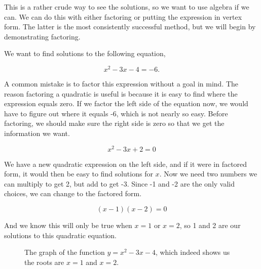 This is a rather crude way to see the solutions, so we want to use algebra if we can.  We can do this with either factoring or putting the expression in vertex form.  The latter is the most consistently successful method, but we will begin by demonstrating factoring.

We want to find solutions to the following equation,

$$x^2 - 3x - 4 = - 6.$$

A common mistake is to factor this expression without a goal in mind.  The reason factoring a quadratic is useful is because it is easy to find where the expression equals zero.  If we factor the left side of the equation now, we would have to figure out where it equals -6, which is not nearly so easy.  Before factoring, we should make sure the right side is zero so that we get the information we want.

$$x^2 - 3x + 2 = 0$$

We have a new quadratic expression on the left side, and if it were in factored form, it would then be easy to find solutions for $x$.  Now we need two numbers we can multiply to get 2, but add to get -3.  Since -1 and -2 are the only valid choices, we can change to the factored form.

$$(x-1)(x-2) = 0$$

And we know this will only be true when $x = 1$ or $x = 2$, so 1 and 2 are our solutions to this quadratic equation.

\begin{figure*}[h]
\begin{center}
\caption{The graph of the function $y=x^2-3x-4$, which indeed shows us the roots are $x=1$ and $x=2$.}
\end{center}
\end{figure*}


